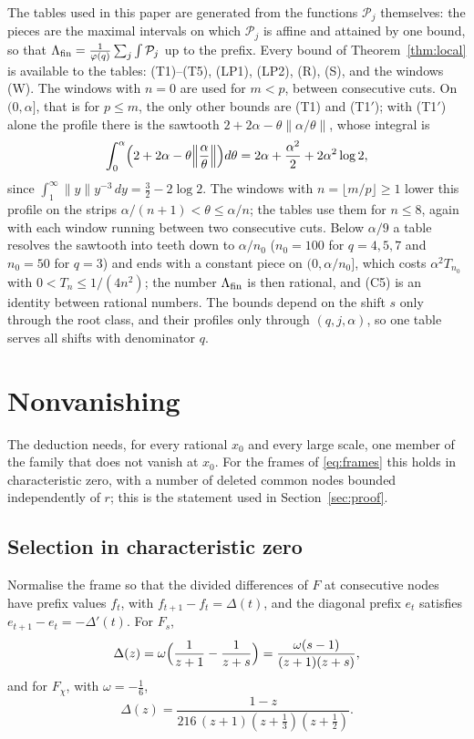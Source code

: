 \documentclass[11pt]{amsart}
\theoremstyle{definition}
\theoremstyle{remark}
\numberwithin{equation}{section}
\begin{document}
The tables used in this paper are generated from the functions $\mathcal P_j$ themselves: the pieces are the maximal
intervals on which $\mathcal P_j$ is affine and attained by one bound, so that
$\Lambda_{\rm fin}=\frac1{\varphi(q)}\sum_j\int\mathcal P_j$ up to the prefix. Every bound of Theorem~\ref{thm:local} is available to the tables: (T1)--(T5), (LP1), (LP2), (R), (S), and the
windows (W). The windows with $n=0$ are used for $m<p$, between consecutive cuts. On $(0,\alpha]$, that is for $p\le m$,
the only other bounds are (T1) and (T1$'$); with (T1$'$) alone the profile there is the sawtooth
$2+2\alpha-\theta\|\alpha/\theta\|$, whose integral is
\[
 \int_0^\alpha\Bigl(2+2\alpha-\theta\Bigl\|\frac\alpha\theta\Bigr\|\Bigr)d\theta=2\alpha+\frac{\alpha^2}2+2\alpha^2\log2,
\]
since $\int_1^\infty\|y\|y^{-3}\,dy=\frac32-2\log2$. The windows with $n=\lfloor m/p\rfloor\ge1$ lower this profile on the
strips $\alpha/(n+1)<\theta\le\alpha/n$; the tables use them for $n\le8$, again with each window running between two
consecutive cuts. Below $\alpha/9$ a table resolves the sawtooth into teeth down to $\alpha/n_0$
($n_0=100$ for $q=4,5,7$ and $n_0=50$ for $q=3$) and ends with a constant piece on $(0,\alpha/n_0]$, which costs $\alpha^2T_{n_0}$
with $0<T_n\le1/(4n^2)$; the number $\Lambda_{\rm fin}$ is then rational, and (C5) is an identity between rational numbers.
The bounds depend on the shift $s$ only through the root class, and their profiles only through $(q,j,\alpha)$, so one
table serves all shifts with denominator $q$.

\section{Nonvanishing}\label{sec:nonvanishing}

The deduction needs, for every rational $x_0$ and every large scale, one member of the family that does not vanish at
$x_0$. For the frames of \eqref{eq:frames} this holds in characteristic zero, with a number of deleted common nodes
bounded independently of $r$; this is the statement used in Section~\ref{sec:proof}.

\subsection{Selection in characteristic zero}\label{ssec:selection}
Normalise the frame so that the divided differences of $F$ at consecutive nodes have prefix values $f_t$, with
$f_{t+1}-f_t=\Delta(t)$, and the diagonal prefix $e_t$ satisfies $e_{t+1}-e_t=-\Delta'(t)$. For $F_s$,
\[
 \Delta(z)=\omega\Bigl(\frac1{z+1}-\frac1{z+s}\Bigr)=\frac{\omega(s-1)}{(z+1)(z+s)} ,
\]
and for $F_\chi$, with $\omega=-\frac16$,
\[
 \Delta(z)=\frac{1-z}{216\,(z+1)(z+\frac13)(z+\frac12)} .
\]
\end{document}
